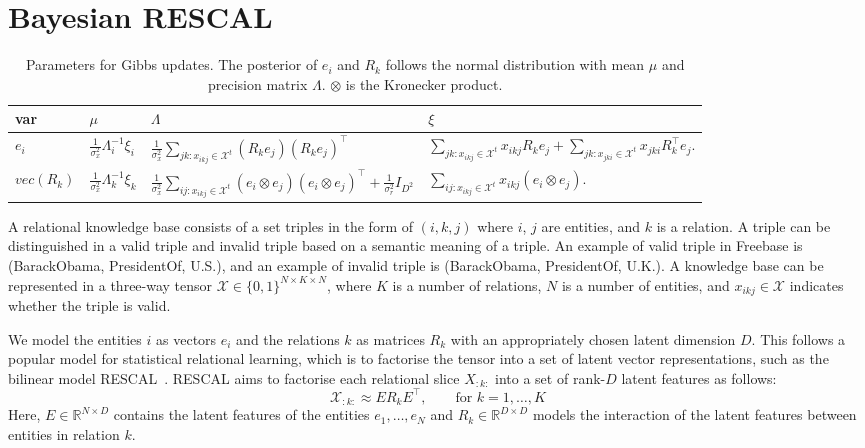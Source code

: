 \section{Bayesian RESCAL}
\label{sec:brescal}

\begin{table*}[bt]
\caption{Parameters for Gibbs updates. The posterior of $e_i$ and $R_k$ follows the normal distribution with mean $\mu$ and precision matrix $\Lambda$. $\otimes$ is the Kronecker product.}
\label{tab:brescalposterior}
\vskip 0.05in
\begin{tabu}{l|l|l|l}
var&$\mu$&$\Lambda$&$\xi$\\
\hline
$e_i$&
$\frac{1}{\sigma_x^2}\Lambda_i^{-1}\xi_i$&
$\frac{1}{\sigma_x^2} \sum_{jk : x_{ikj} \in \mathcal{X}^{t}} (R_k e_j)(R_k e_j)^\top$&
$\sum_{jk : x_{ikj} \in \mathcal{X}^{t}}  x_{ikj} R_{k} e_{j} +
\sum_{jk : x_{jki} \in \mathcal{X}^{t}} x_{jki} R_{k}^\top e_{j}.$
\\
$vec(R_k)$&
$\frac{1}{\sigma_x^2}\Lambda_k^{-1}\xi_k$&
$\frac{1}{\sigma_x^2} \sum_{ij:x_{ikj} \in \mathcal{X}^{t}} (e_i
\otimes e_j)(e_i \otimes e_j)^\top + \frac{1}{\sigma_r^2} {I}_{D^2}$&
$\sum_{ij:x_{ikj} \in \mathcal{X}^{t}} x_{ikj} (e_{i} \otimes e_{j}).$
\end{tabu}
\end{table*}


A relational knowledge base consists of a set triples in the form of $(i, k, j)$
where $i$, $j$ are entities, and $k$ is a relation. A triple can be distinguished
in a valid triple and invalid triple based on a semantic meaning of a triple. An
example of valid triple in Freebase is (BarackObama, PresidentOf, U.S.), and an
example of invalid triple is (BarackObama, PresidentOf, U.K.).
A knowledge base can be represented in a three-way tensor
$\mathcal{X} \in \{0, 1\}^{N \times K \times N}$, where $K$ is a number of
relations, $N$ is a number of entities, and $x_{ikj}\in\mathcal{X}$ indicates whether
the triple is valid.

We model the entities $i$ as vectors $e_i$ and the relations $k$ as matrices $R_k$ with an
appropriately chosen latent dimension $D$. This follows a popular model
for statistical relational learning, which is to factorise the tensor into a
set of latent vector representations, such as the bilinear model RESCAL~\cite{nickel2011three}.
RESCAL aims to factorise each relational slice $X_{:k:}$ into a set of rank-$D$ latent
features as follows:
\[
  \mathcal{X}_{:k:} \approx E R_k E^\top, \qquad \text{for } k = 1, \dots, K
\]
Here, $E\in {\mathbb R}^{N \times D}$ contains the latent features of the
entities $e_1, \ldots, e_N$ and $R_k\in {\mathbb R}^{D \times D}$ models the interaction of the
latent features between entities in relation $k$.

